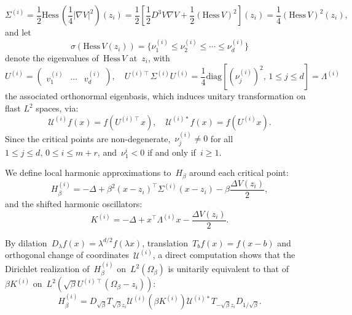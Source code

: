 \documentclass[10pt]{article}
\newcommand{\R}{\mathbb{R}}
\newcommand{\Hess}{\mathrm{Hess}\,}
\newcommand{\1}{\mathbbm 1}
\newcommand{\Ki}[1]{K^{(i)}_{#1}}
\begin{document}
    \[\Sigma^{(i)} = \frac12\Hess (\frac14|\nabla V|^2)(z_i)  = \frac12\left[\frac12 D^3 V \nabla V + \frac12 \left( \Hess V\right)^2 \right](z_i) = \frac14 \left(\Hess V\right)^2(z_i),\]
    and let
    \[\sigma(\Hess V(z_i)) = \{\nu_1^{(i)} \leq \nu_2^{(i)} \leq \dotsm \leq \nu_d^{(i)}\}\]
    denote the eigenvalues of~$\Hess V$ at~$z_i$, with
    \[U^{(i)} =\begin{pmatrix}v_1^{(i)}&\dotsm&v_d^{(i)}\end{pmatrix},\quad U^{(i)\intercal} \Sigma^{(i)} U^{(i)} = \frac14\mathrm{diag}\left[\left(\nu_j^{(i)}\right)^2,\,1\leq j\leq d\right] = \Lambda^{(i)}\]
    the associated orthonormal eigenbasis, which induces unitary transformation on flast $L^2$ spaces, via:
   ~$$ \mathcal U^{(i)} f(x) = f\left( U^{(i)\intercal}x\right),\quad \mathcal U^{(i)*} f(x) = f\left( U^{(i)}x\right).$$
    Since the critical points are non-degenerate,~$\nu_j^{(i)} \neq 0$ for all~$1\leq j\leq d,\,0\leq i \leq m+r$, and~$\nu_1^{i} < 0$ if and only if~$i\geq 1$.
    
    We define local harmonic approximations to~$H_\beta$ around each critical point:
    \[ H_\beta^{(i)} = -\Delta + \beta^2 (x-z_i)^\intercal \Sigma^{(i)}(x-z_i) - \beta \frac{\Delta V(z_i)}2, \]
    and the shifted harmonic oscillators:
    \[\Ki{} = -\Delta  + x^\intercal \Lambda^{(i)}x -\frac{\Delta V(z_i)}2.\]

    By dilation~$D_\lambda f(x) = \lambda^{d/2}f(\lambda x)$, translation~$T_b f(x) = f(x-b)$ and orthogonal change of coordinates~$\mathcal U^{(i)}$, a direct computation shows that
    the Dirichlet realization of~$H_{\beta}^{(i)}$ on~$L^2(\Omega_\beta)$ is unitarily equivalent to that of~$\beta \Ki{}$ on~$L^2(\sqrt{\beta}U^{(i)\intercal}(\Omega_\beta-z_i))$:
    \begin{equation}
        \label{eq:harmonic_conjugation}
        H_{\beta}^{(i)} = D_{\sqrt\beta}T_{\sqrt\beta z_i}\mathcal U^{(i)}\left(\beta \Ki{}\right)\mathcal U^{(i)*}T_{-\sqrt\beta z_i}D_{1/\sqrt\beta}.
    \end{equation}

\end{document}
